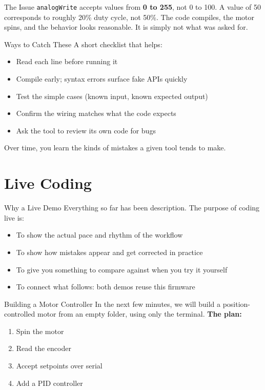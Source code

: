 \documentclass[aspectratio=169,11pt]{beamer}
\begin{document}
\begin{frame}{The Issue}
  \texttt{analogWrite} accepts values from \textbf{0 to 255}, not 0 to 100.
  \vfill
  A value of 50 corresponds to roughly 20\% duty cycle, not 50\%. The code compiles, the motor spins, and the behavior looks reasonable. It is simply not what was asked for.
\end{frame}

\begin{frame}{Ways to Catch These}
  A short checklist that helps:
  \vfill
  \begin{itemize}
    \setlength\itemsep{0.4em}
    \item Read each line before running it
    \item Compile early; syntax errors surface fake APIs quickly
    \item Test the simple cases (known input, known expected output)
    \item Confirm the wiring matches what the code expects
    \item Ask the tool to review its own code for bugs
  \end{itemize}
  \vfill
  Over time, you learn the kinds of mistakes a given tool tends to make.
\end{frame}

\section{Live Coding}

\begin{frame}{Why a Live Demo}
  Everything so far has been description. The purpose of coding live is:
  \vfill
  \begin{itemize}
    \setlength\itemsep{0.4em}
    \item To show the actual pace and rhythm of the workflow
    \item To show how mistakes appear and get corrected in practice
    \item To give you something to compare against when you try it yourself
    \item To connect what follows: both demos reuse this firmware
  \end{itemize}
\end{frame}

\begin{frame}{Building a Motor Controller}
  In the next few minutes, we will build a position-controlled motor from an empty folder, using only the terminal.
  \vfill
  \textbf{The plan:}
  \begin{enumerate}
    \setlength\itemsep{0.3em}
    \item Spin the motor
    \item Read the encoder
    \item Accept setpoints over serial
    \item Add a PID controller
  \end{enumerate}
\end{frame}
\end{document}
